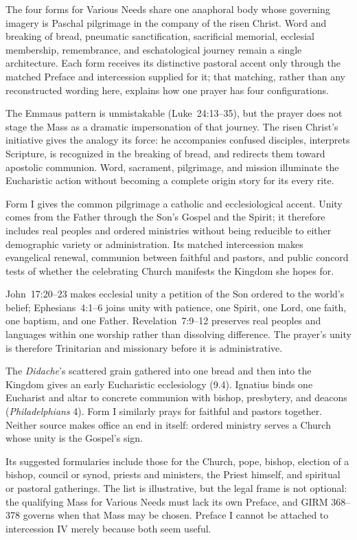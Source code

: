 The four forms for Various Needs share one anaphoral body whose governing imagery is Paschal pilgrimage in the company of the risen Christ. Word and breaking of bread, pneumatic sanctification, sacrificial memorial, ecclesial membership, remembrance, and eschatological journey remain a single architecture. Each form receives its distinctive pastoral accent only through the matched Preface and intercession supplied for it; that matching, rather than any reconstructed wording here, explains how one prayer has four configurations.

The Emmaus pattern is unmistakable (Luke~24:13--35), but the prayer does not stage the Mass as a dramatic impersonation of that journey. The risen Christ's initiative gives the analogy its force: he accompanies confused disciples, interprets Scripture, is recognized in the breaking of bread, and redirects them toward apostolic communion. Word, sacrament, pilgrimage, and mission illuminate the Eucharistic action without becoming a complete origin story for its every rite.

Form I gives the common pilgrimage a catholic and ecclesiological accent. Unity comes from the Father through the Son's Gospel and the Spirit; it therefore includes real peoples and ordered ministries without being reducible to either demographic variety or administration. Its matched intercession makes evangelical renewal, communion between faithful and pastors, and public concord tests of whether the celebrating Church manifests the Kingdom she hopes for.

John~17:20--23 makes ecclesial unity a petition of the Son ordered to the world's belief; Ephesians~4:1--6 joins unity with patience, one Spirit, one Lord, one faith, one baptism, and one Father. Revelation~7:9--12 preserves real peoples and languages within one worship rather than dissolving difference. The prayer's unity is therefore Trinitarian and missionary before it is administrative.

The \emph{Didache}'s scattered grain gathered into one bread and then into the Kingdom gives an early Eucharistic ecclesiology (9.4). Ignatius binds one Eucharist and altar to concrete communion with bishop, presbytery, and deacons (\emph{Philadelphians} 4). Form I similarly prays for faithful and pastors together. Neither source makes office an end in itself: ordered ministry serves a Church whose unity is the Gospel's sign.

Its suggested formularies include those for the Church, pope, bishop, election of a bishop, council or synod, priests and ministers, the Priest himself, and spiritual or pastoral gatherings. The list is illustrative, but the legal frame is not optional: the qualifying Mass for Various Needs must lack its own Preface, and GIRM 368--378 governs when that Mass may be chosen. Preface I cannot be attached to intercession IV merely because both seem useful.


